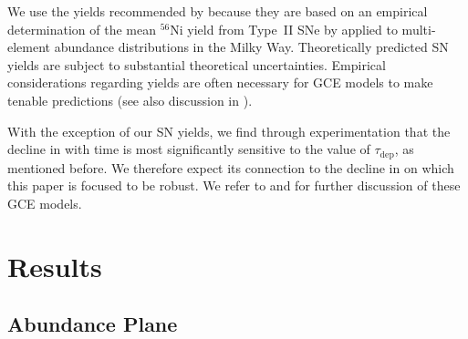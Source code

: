 We use the yields recommended by \citet{2024ApJ...973..122W} because they are based on an empirical determination of the mean $^{56}$Ni yield from Type~II SNe by \citet{Rodriguez2021, Rodriguez2023} applied to multi-element abundance distributions in the Milky Way. Theoretically predicted SN yields \citep[e.g.][]{Seitenzahl2013, Sukhbold2016, Limongi2018, Gronow2021} are subject to substantial theoretical uncertainties. Empirical considerations regarding yields are often necessary for GCE models to make tenable predictions (see also discussion in \citealt{Palla2022}).

With the exception of our SN yields, we find through experimentation that the decline in \MgFe{} with time is most significantly sensitive to the value of $\tau_{\textrm{dep}}$, as mentioned before. We therefore expect its connection to the decline in \MgFe{} on which this paper is focused to be robust. We refer to \citet{2020MNRAS.498.1364J} and \citet{2022arXiv220402989C} for further discussion of these GCE models.

\section{Results}\label{sec:results}
\subsection{Abundance Plane}\label{ssec:plane}

